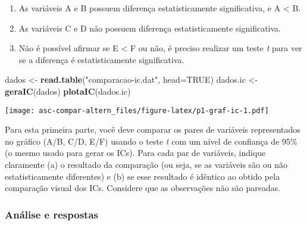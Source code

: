 \documentclass[
]{article}
\newenvironment{Shaded}{\begin{snugshade}}{\end{snugshade}}
\newcommand{\AttributeTok}[1]{\textcolor[rgb]{0.13,0.29,0.53}{#1}}
\newcommand{\CommentTok}[1]{\textcolor[rgb]{0.56,0.35,0.01}{\textit{#1}}}
\newcommand{\ConstantTok}[1]{\textcolor[rgb]{0.56,0.35,0.01}{#1}}
\newcommand{\FloatTok}[1]{\textcolor[rgb]{0.00,0.00,0.81}{#1}}
\newcommand{\FunctionTok}[1]{\textcolor[rgb]{0.13,0.29,0.53}{\textbf{#1}}}
\newcommand{\NormalTok}[1]{#1}
\newcommand{\OtherTok}[1]{\textcolor[rgb]{0.56,0.35,0.01}{#1}}
\newcommand{\SpecialCharTok}[1]{\textcolor[rgb]{0.81,0.36,0.00}{\textbf{#1}}}
\newcommand{\StringTok}[1]{\textcolor[rgb]{0.31,0.60,0.02}{#1}}
\providecommand{\tightlist}{%
  \setlength{\itemsep}{0pt}\setlength{\parskip}{0pt}}
\begin{document}
\begin{enumerate}
\def\labelenumi{\arabic{enumi}.}
\tightlist
\item
  As variáveis A e B possuem diferença estatisticamente significativa, e
  A \textless{} B.
\item
  As variáveis C e D não possuem diferença estatisticamente
  significativa.
\item
  Não é possível afirmar se E \textless{} F ou não, é preciso realizar
  um teste \emph{t} para ver se a diferença é estatisticamente
  significativa.
\end{enumerate}

\begin{Shaded}
\begin{Highlighting}[]
\NormalTok{dados }\OtherTok{\textless{}{-}} \FunctionTok{read.table}\NormalTok{(}\StringTok{"comparacao{-}ic.dat"}\NormalTok{, }\AttributeTok{head=}\ConstantTok{TRUE}\NormalTok{)}
\NormalTok{dados.ic }\OtherTok{\textless{}{-}} \FunctionTok{geraIC}\NormalTok{(dados)}
\FunctionTok{plotaIC}\NormalTok{(dados.ic)}
\end{Highlighting}
\end{Shaded}

\texttt{[image: asc-compar-altern\_files/figure-latex/p1-graf-ic-1.pdf]}

Para esta primeira parte, você deve comparar os pares de variáveis
representados no gráfico (A/B, C/D, E/F) usando o teste \emph{t} com um
nível de confiança de 95\% (o mesmo usado para gerar os ICs). Para cada
par de variáveis, indique claramente (a) o resultado da comparação (ou
seja, se as variáveis são ou não estatisticamente diferentes) e (b) se
esse resultado é idêntico ao obtido pela comparação visual dos ICs.
Considere que as observações não são pareadas.

\hypertarget{anuxe1lise-e-respostas}{%
\subsubsection{Análise e respostas}\label{anuxe1lise-e-respostas}}

\begin{Shaded}
\end{Shaded}
\end{document}
